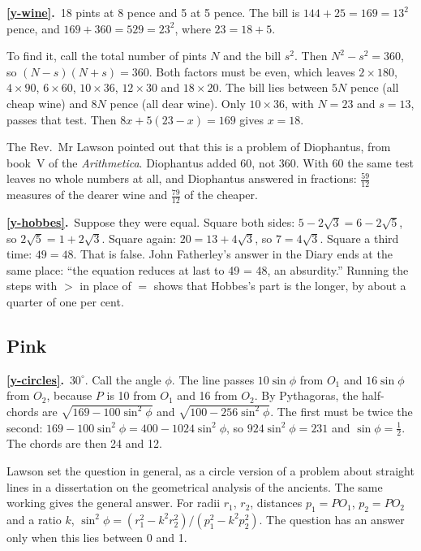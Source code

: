 \documentclass[11pt,a4paper]{article}
\newcounter{prob}
\newcommand{\ans}[2]{\par\smallskip\noindent\textbf{\ref{#1}.}\ #2}
\begin{document}
\ans{y-wine}{18 pints at 8 pence and 5 at 5 pence. The bill is $144 + 25 = 169 = 13^2$
pence, and $169 + 360 = 529 = 23^2$, where $23 = 18 + 5$.

To find it, call the total number of pints $N$ and the bill $s^2$. Then
$N^2 - s^2 = 360$, so $(N-s)(N+s) = 360$. Both factors must be even, which leaves
$2\times180$, $4\times90$, $6\times60$, $10\times36$, $12\times30$ and $18\times20$. The bill
lies between $5N$ pence (all cheap wine) and $8N$ pence (all dear wine). Only
$10\times36$, with $N = 23$ and $s = 13$, passes that test. Then $8x + 5(23-x) = 169$
gives $x = 18$.

The Rev.\ Mr Lawson pointed out that this is a problem of Diophantus, from book~V of the
\textit{Arithmetica}. Diophantus added 60, not 360. With 60 the same test leaves no whole
numbers at all, and Diophantus answered in fractions: $\tfrac{59}{12}$ measures of the
dearer wine and $\tfrac{79}{12}$ of the cheaper.}

\ans{y-hobbes}{Suppose they were equal. Square both sides: $5 - 2\sqrt3 = 6 - 2\sqrt5$, so
$2\sqrt5 = 1 + 2\sqrt3$. Square again: $20 = 13 + 4\sqrt3$, so $7 = 4\sqrt3$. Square a
third time: $49 = 48$. That is false. John Fatherley's answer in the Diary ends at the
same place: ``the equation reduces at last to 49 = 48, an absurdity.'' Running the
steps with $>$ in place of $=$ shows that Hobbes's part is the longer, by about a quarter
of one per cent.}

\subsection*{\color{bandpink}Pink}

\ans{y-circles}{$30^\circ$. Call the angle $\phi$. The line passes $10\sin\phi$ from $O_1$
and $16\sin\phi$ from $O_2$, because $P$ is 10 from $O_1$ and 16 from $O_2$. By
Pythagoras, the half-chords are $\sqrt{169 - 100\sin^2\phi}$ and
$\sqrt{100 - 256\sin^2\phi}$. The first must be twice the second:
$169 - 100\sin^2\phi = 400 - 1024\sin^2\phi$, so $924\sin^2\phi = 231$ and
$\sin\phi = \tfrac12$. The chords are then 24 and 12.

Lawson set the question in general, as a circle version of a problem about straight
lines in a dissertation on the geometrical analysis of the ancients. The same working
gives the general answer. For radii $r_1$, $r_2$, distances $p_1 = PO_1$, $p_2 = PO_2$ and a
ratio $k$, $\sin^2\phi = (r_1^2 - k^2r_2^2)/(p_1^2 - k^2p_2^2)$. The question has an answer
only when this lies between 0 and 1.}
\end{document}
